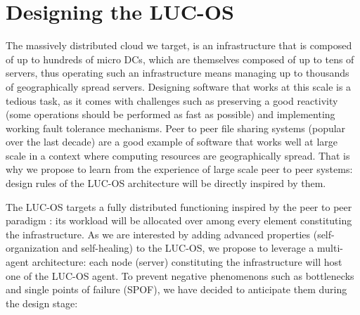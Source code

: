 \section{Designing the LUC-OS}
\label{sec:lucos}

The massively distributed cloud we target, is an infrastructure that is composed
of up to hundreds of micro DCs, which are themselves composed of up to tens of 
servers, thus operating such an infrastructure means managing up to thousands of
geographically spread servers. Designing software that works at this scale is a
tedious task, as it comes with challenges such as preserving a good reactivity
(some operations should be performed as fast as possible) and implementing 
working fault tolerance mechanisms. Peer to peer file sharing systems (popular 
over the last decade) are a good example of software that works well at large 
scale in a context where computing resources are geographically spread. That is 
why we propose to learn from the experience of large scale peer to peer systems:
design rules of the LUC-OS architecture will be directly inspired by them. 

The LUC-OS targets a fully distributed functioning inspired by the peer to peer
paradigm : its workload will be allocated over among every element constituting
the infrastructure. As we are interested by adding advanced properties 
(self-organization and self-healing) to the LUC-OS, we propose to leverage a 
multi-agent architecture: each node (server) constituting the infrastructure 
will host one of the LUC-OS agent. To prevent negative phenomenons such as
bottlenecks and single points of failure (SPOF), we have decided to anticipate
them during the design stage:

